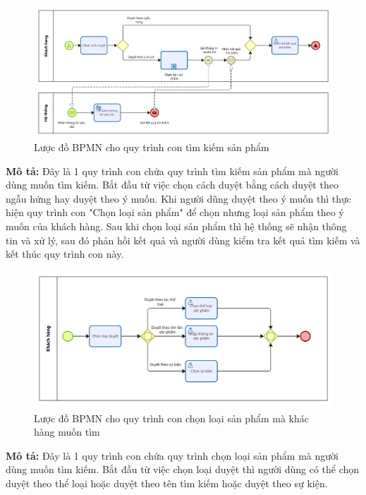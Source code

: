 \begin{figure}[!htp]
	\centering
	\includegraphics[width=13cm]{img/BPMN/customer_buy/customer_search_product.png}
	\newline
	\caption{Lược đồ BPMN cho quy trình con tìm kiếm sản phẩm}
\end{figure}
\textbf{Mô tả:} Đây là 1 quy trình con chứa quy trình tìm kiếm sản phẩm mà người dùng muốn tìm kiếm. Bắt đầu từ việc chọn cách duyệt bằng cách duyệt theo ngẫu hứng hay duyệt theo ý muốn. Khi người dũng duyệt theo ý muốn thì thực hiện quy trình con "Chọn loại sản phẩm" để chọn nhưng loại sản phẩm theo ý muốn của khách hàng. Sau khi chọn loại sản phẩm thì hệ thống sẽ nhận thông tin và xử lý, sau đó phản hồi kết quả và người dùng kiểm tra kết quả tìm kiếm và kết thúc quy trình con này.

\begin{figure}[!htp]
	\centering
	\includegraphics[width=12cm]{img/BPMN/customer_buy/customer_select_type.png}
	\newline
	\caption{Lược đồ BPMN cho quy trình con chọn loại sản phẩm mà khác hàng muốn tìm}
\end{figure}
\textbf{Mô tả:} Đây là 1 quy trình con chứa quy trình chọn loại sản phẩm mà người dùng muốn tìm kiếm. Bắt đầu từ việc chọn loại duyệt thì người dùng có thể chọn duyệt theo thể loại hoặc duyệt theo tên tìm kiếm hoặc duyệt theo sự kiện.

